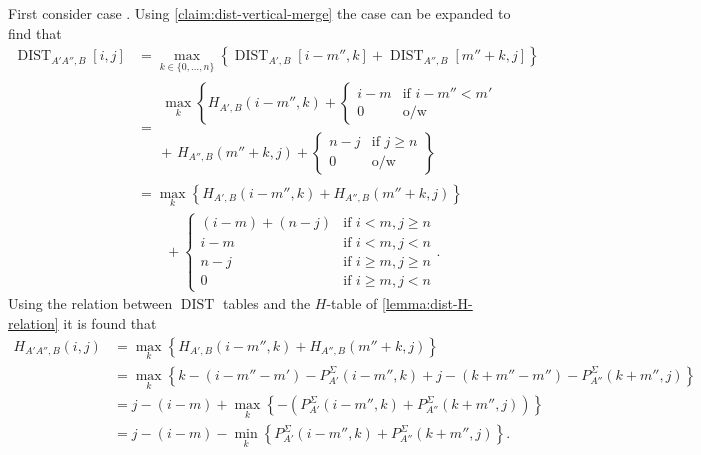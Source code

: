 \documentclass[twoside,11pt,openright]{report}
\newcommand{\DIST}{\operatorname{DIST}}
\newcommand*{\circled}[1]{\tikz[baseline=(char.base)]{
                          \node[shape=circle,draw,inner sep=2pt] (char) {#1};}}
\begin{document}
First consider case \circled{3}. Using \cref{claim:dist-vertical-merge} the case can be expanded to find that
\begin{align*}
  \DIST_{A'A'',B}[i, j] &= \max_{k \in \{0, \dots, n\} } \left\{ \DIST_{A',B}[i - m'', k] + \DIST_{A'',B}[m'' + k, j] \right\} \\
              &=  \begin{aligned}
                    \max_k \left\{
                      H_{A',B}(i - m'', k) + \left\{
                        \begin{array}{ll}
                          i - m & \text{if } i - m'' < m' \\
                          0     & \text{o/w}
                        \end{array} \right. \right. \\
                      \left. +\,\,H_{A'',B}(m'' + k, j) + \left\{
                        \begin{array}{ll}
                          n - j & \text{if } j \geq n \\
                          0     & \text{o/w}
                        \end{array} \right.
                    \right\}
                 \end{aligned}\\
              &= \max_k \left\{ H_{A',B}(i - m'', k) + H_{A'',B}(m'' + k, j) \right\}
                  \\ &\quad\quad+ \begin{cases}
                      (i - m) + (n - j)   & \text{if } i < m, j \geq n \\
                      i - m               & \text{if } i < m, j < n \\
                      n - j               & \text{if } i \geq m, j \geq n \\
                      0                   & \text{if } i \geq m, j < n
                    \end{cases}.
\end{align*}
Using the relation between $\DIST$ tables and the $H$-table of \cref{lemma:dist-H-relation} it is found that
\begin{align*}
  H_{A'A'',B}(i, j) &= \max_k \left\{ H_{A',B}(i - m'', k) + H_{A'',B}(m'' + k, j) \right\} \\
                    &= \max_k \left\{ k - (i - m'' - m') - P_{A'}^{\Sigma}(i - m'', k) + j - (k + m'' - m'') - P_{A''}^{\Sigma}(k + m'', j) \right\} \\
                    &= j - (i - m) + \max_k \left\{ -\left( P_{A'}^{\Sigma}(i - m'', k) + P_{A''}^{\Sigma}(k + m'', j) \right)  \right\} \\
                    &= j - (i - m) - \min_k \left\{ P_{A'}^{\Sigma}(i - m'', k) + P_{A''}^{\Sigma}(k + m'', j) \right\}.
\end{align*}
\end{document}
